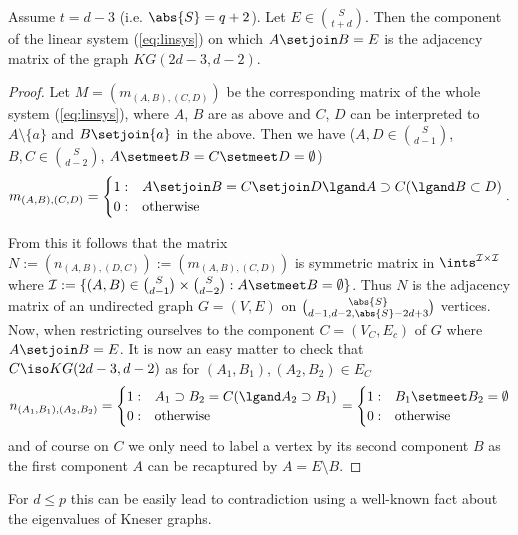 \message{ !name(OnTheRAIDProblem.tex)}\documentclass[8pt,a4paper]{article}
\begin{document}
\begin{lemma}
Assume $t=d-3$ (i.e. $\abs{S}=q+2$).
Let $E\in\binom{S}{t+d}$. Then the component of the linear system (\ref{eq:linsys}) on which $A\setjoin B=E$ is the adjacency matrix of the graph $KG(2d-3,d-2)$.
\end{lemma} 

\begin{proof}
Let $M=(m_{(A,B),(C,D)})$ be the corresponding matrix of the whole system (\ref{eq:linsys}), where $A$, $B$ are as above and $C$, $D$ can be interpreted to $A\setminus\{a\}$ and $B\setjoin\{a\}$ in the above.
Then we have ($A,D\in\binom{S}{d-1}$, $B,C\in\binom{S}{d-2}$, $A\setmeet B=C\setmeet D = \emptyset$)
\begin{equation}
m_{(A,B),(C,D)}=
\begin{cases}
1 :& A\setjoin B = C\setjoin D \lgand A\supset C (\lgand B\subset D)\\
0 :& \text{otherwise}  
\end{cases}\text{.}
\end{equation}

From this it follows that the matrix $N:=(n_{(A,B),(D,C)}):=(m_{(A,B),(C,D)})$ is symmetric matrix in $\ints^{\mathcal{I}\times\mathcal{I}}$ where $\mathcal{I}:=\{(A,B)\in\binom{S}{d-1}\times\binom{S}{d-2}:A\setmeet B=\emptyset\}$. Thus $N$ is the adjacency matrix of an undirected graph $G=(V,E)$ on $\binom{\abs{S}}{d-1,d-2,\abs{S}-2d+3}$ vertices.
Now, when restricting ourselves to the component $C=(V_C,E_c)$ of $G$ where $A\setjoin B=E$. It is now an easy matter to check that $C\iso KG(2d-3,d-2)$ as for $(A_1,B_1),(A_2,B_2)\in E_C$
\begin{equation}
n_{(A_1,B_1),(A_2,B_2)}=
\begin{cases}
1 :& A_1\supset B_2 = C (\lgand A_2\supset B_1)\\
0 :& \text{otherwise}  
\end{cases}
=
\begin{cases}
1 :& B_1\setmeet B_2 = \emptyset\\
0 :& \text{otherwise}  
\end{cases}
\end{equation}
and of course on $C$ we only need to label a vertex by its second component $B$ as the first component $A$ can be recaptured by $A=E\setminus B$.
\end{proof}

For $d\leq p$ this can be easily lead to contradiction using a well-known fact about the eigenvalues of Kneser graphs.
\end{document}
